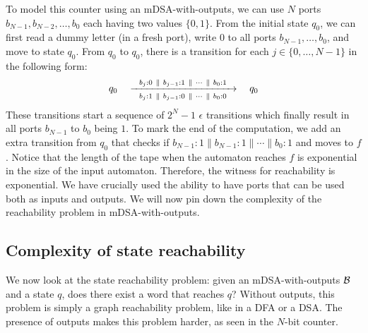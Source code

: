 To model this counter using an mDSA-with-outputs, we can use $N$ ports $b_{N-1}, b_{N-2}, \dots, b_0$ each having two values $\{0, 1\}$. From the initial state $q_0$, we can first read a dummy letter (in a fresh port), write $0$ to all ports $b_{N-1}, \dots, b_0$, and move to state $q_0$. From $q_{0}$ to $q_{0}$, there is a transition for each $j \in \{0, \dots, N-1\}$ in the following form: 
\begin{align*}
q_0 \quad \xrightarrow[~~b_j:1 ~\parallel~ b_{j-1}:0 ~\parallel~ \cdots ~\parallel~ b_0: 0~~]{ b_j:0 ~\parallel~ b_{j-1}:1 ~\parallel~ \cdots ~\parallel~ b_0: 1} \quad q_0
\end{align*}
These transitions start a sequence of $2^N -1$ $\epsilon$ transitions which finally result in all ports $b_{N-1}$ to $b_0$ being $1$. To mark the end of the computation, we add an extra transition from $q_0$ that checks if $b_{N-1}:1 \parallel b_{N-1}:1 \parallel \cdots \parallel b_0:1$ and moves to $f$. Notice that the length of the tape when the automaton reaches $f$ is exponential in the size of the input automaton. Therefore, the witness for reachability is exponential. We have crucially used the ability to have ports that can be used both as inputs and outputs. We will now pin down the complexity of the reachability problem in mDSA-with-outputs. 

\subsection{Complexity of state reachability}

We now look at the state reachability problem: given an mDSA-with-outputs $\mathcal{B}$ and a state $q$, does there exist a word that reaches $q$? Without outputs, this problem is simply a graph reachability problem, like in a DFA or a DSA. The presence of outputs makes this problem harder, as seen in the $N$-bit counter.




\endinput
In order to represent Expressive Decision Tables (EDTs) succinctly, we require an additional feature in the automaton -- the presence of output ports and more importantly input/output (IO) ports. When a transition is matched, we also require a certain output to be produced in an output port. Sometimes, these output ports can also be treated as inputs and checked for suffixes in the transition labels. Such ports will be called IO ports. Addition of these special ports enables a clean translation of EDTs to mDSAs. At the same time, as we will see, they make the emptiness problem significantly more complex. 

